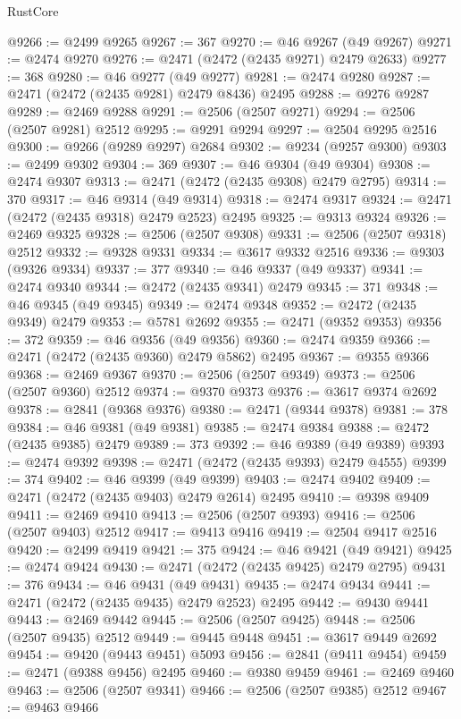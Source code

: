 \begin{lexlean}{RustCore}
\begin{coremodule}
@9266 := @2499 @9265
@9267 := 367
@9270 := @46 @9267 (@49 @9267)
@9271 := @2474 @9270
@9276 := @2471 (@2472 (@2435 @9271) @2479 @2633)
@9277 := 368
@9280 := @46 @9277 (@49 @9277)
@9281 := @2474 @9280
@9287 := @2471 (@2472 (@2435 @9281) @2479 @8436) @2495
@9288 := @9276 @9287
@9289 := @2469 @9288
@9291 := @2506 (@2507 @9271)
@9294 := @2506 (@2507 @9281) @2512
@9295 := @9291 @9294
@9297 := @2504 @9295 @2516
@9300 := @9266 (@9289 @9297) @2684
@9302 := @9234 (@9257 @9300)
@9303 := @2499 @9302
@9304 := 369
@9307 := @46 @9304 (@49 @9304)
@9308 := @2474 @9307
@9313 := @2471 (@2472 (@2435 @9308) @2479 @2795)
@9314 := 370
@9317 := @46 @9314 (@49 @9314)
@9318 := @2474 @9317
@9324 := @2471 (@2472 (@2435 @9318) @2479 @2523) @2495
@9325 := @9313 @9324
@9326 := @2469 @9325
@9328 := @2506 (@2507 @9308)
@9331 := @2506 (@2507 @9318) @2512
@9332 := @9328 @9331
@9334 := @3617 @9332 @2516
@9336 := @9303 (@9326 @9334)
@9337 := 377
@9340 := @46 @9337 (@49 @9337)
@9341 := @2474 @9340
@9344 := @2472 (@2435 @9341) @2479
@9345 := 371
@9348 := @46 @9345 (@49 @9345)
@9349 := @2474 @9348
@9352 := @2472 (@2435 @9349) @2479
@9353 := @5781 @2692
@9355 := @2471 (@9352 @9353)
@9356 := 372
@9359 := @46 @9356 (@49 @9356)
@9360 := @2474 @9359
@9366 := @2471 (@2472 (@2435 @9360) @2479 @5862) @2495
@9367 := @9355 @9366
@9368 := @2469 @9367
@9370 := @2506 (@2507 @9349)
@9373 := @2506 (@2507 @9360) @2512
@9374 := @9370 @9373
@9376 := @3617 @9374 @2692
@9378 := @2841 (@9368 @9376)
@9380 := @2471 (@9344 @9378)
@9381 := 378
@9384 := @46 @9381 (@49 @9381)
@9385 := @2474 @9384
@9388 := @2472 (@2435 @9385) @2479
@9389 := 373
@9392 := @46 @9389 (@49 @9389)
@9393 := @2474 @9392
@9398 := @2471 (@2472 (@2435 @9393) @2479 @4555)
@9399 := 374
@9402 := @46 @9399 (@49 @9399)
@9403 := @2474 @9402
@9409 := @2471 (@2472 (@2435 @9403) @2479 @2614) @2495
@9410 := @9398 @9409
@9411 := @2469 @9410
@9413 := @2506 (@2507 @9393)
@9416 := @2506 (@2507 @9403) @2512
@9417 := @9413 @9416
@9419 := @2504 @9417 @2516
@9420 := @2499 @9419
@9421 := 375
@9424 := @46 @9421 (@49 @9421)
@9425 := @2474 @9424
@9430 := @2471 (@2472 (@2435 @9425) @2479 @2795)
@9431 := 376
@9434 := @46 @9431 (@49 @9431)
@9435 := @2474 @9434
@9441 := @2471 (@2472 (@2435 @9435) @2479 @2523) @2495
@9442 := @9430 @9441
@9443 := @2469 @9442
@9445 := @2506 (@2507 @9425)
@9448 := @2506 (@2507 @9435) @2512
@9449 := @9445 @9448
@9451 := @3617 @9449 @2692
@9454 := @9420 (@9443 @9451) @5093
@9456 := @2841 (@9411 @9454)
@9459 := @2471 (@9388 @9456) @2495
@9460 := @9380 @9459
@9461 := @2469 @9460
@9463 := @2506 (@2507 @9341)
@9466 := @2506 (@2507 @9385) @2512
@9467 := @9463 @9466

\end{coremodule}
\end{lexlean}
